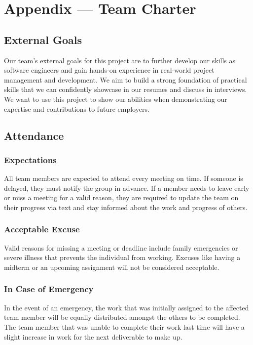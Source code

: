 \documentclass{article}
\begin{document}
\newpage{}

\section*{Appendix --- Team Charter}

\subsection*{External Goals}
Our team’s external goals for this project are to further develop our skills as software engineers and gain hands-on experience in real-world project management and development. We aim to build a strong foundation of practical skills that we can confidently showcase in our resumes and discuss in interviews. We want to use this project to show our abilities when demonstrating our expertise and contributions to future employers.

\subsection*{Attendance}

\subsubsection*{Expectations}
All team members are expected to attend every meeting on time. If someone is delayed, they must notify the group in advance. If a member needs to leave early or miss a meeting for a valid reason, they are required to update the team on their progress via text and stay informed about the work and progress of others.

\subsubsection*{Acceptable Excuse}
Valid reasons for missing a meeting or deadline include family emergencies or severe illness that prevents the individual from working. Excuses like having a midterm or an upcoming assignment will not be considered acceptable.

\subsubsection*{In Case of Emergency}
In the event of an emergency, the work that was initially assigned to the affected team member will be equally distributed amongst the others to be completed. The team member that was unable to complete their work last time will have a slight increase in work for the next deliverable to make up.
\end{document}
